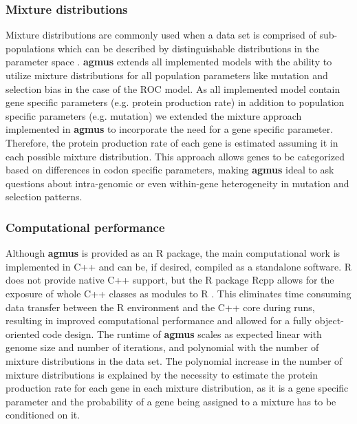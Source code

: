 \documentclass{bioinfo}
\newcommand{\package}{\textbf{agmus }} %
\begin{document}
\subsubsection*{Mixture distributions}
Mixture distributions are commonly used when a data set is comprised of sub-populations which can be described by distinguishable distributions in the parameter space \citep{gelman2013}. 
\package extends all implemented models with the ability to utilize mixture distributions for all population parameters like mutation and selection bias in the case of the ROC model. 
As all implemented model contain gene specific parameters (e.g. protein production rate) in addition to population specific parameters (e.g. mutation) we extended the mixture approach implemented in \package to incorporate the need for a gene specific parameter. 
Therefore, the protein production rate of each gene is estimated assuming it in each possible mixture distribution. 
This approach allows genes to be categorized based on differences in codon specific parameters, making \package ideal to ask questions about intra-genomic or even within-gene heterogeneity in mutation and selection patterns. 

\subsubsection*{Computational performance}
Although \package is provided as an R package, the main computational work is implemented in C++ and can be, if desired, compiled as a standalone software.
R does not provide native C++ support, but the R package Rcpp allows for the exposure of whole C++ classes as modules to R \citep{rcpp_package}.
This eliminates time consuming data transfer between the R environment and the C++ core during runs, resulting in improved computational performance and allowed for a fully object-oriented code design. 
The runtime of \package scales as expected linear with genome size and number of iterations, and polynomial with the number of mixture distributions in the data set. The polynomial increase in the number of mixture distributions is explained by the necessity to estimate the protein production rate for each gene in each mixture distribution, as it is a gene specific parameter and the probability of a gene being assigned to a mixture has to be conditioned on it.  



\end{document}
